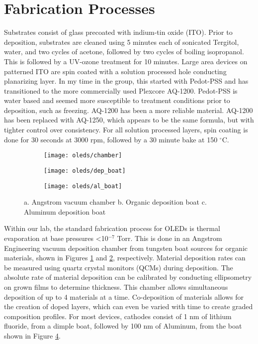 \documentclass[../thesis.tex]{subfiles}
\begin{document}
\section{Fabrication Processes}\label{sec:oleds_fabrication}

Substrates consist of glass precoated with indium-tin oxide (ITO).  
Prior to deposition, substrates are cleaned using 5 minutes each of sonicated Tergitol, water, and two cycles of acetone, followed by two cycles of boiling isopropanol.  
This is followed by a UV-ozone treatment for 10 minutes.  
Large area devices on patterned ITO are spin coated with a solution processed hole conducting planarizing layer.
In my time in the group, this started with Pedot-PSS and has transitioned to the more commercially used Plexcore AQ-1200.
Pedot-PSS is water based and seemed more susceptible to treatment conditions prior to deposition, such as freezing.
AQ-1200 has been a more reliable material.
AQ-1200 has been replaced with AQ-1250, which appears to be the same formula, but with tighter control over consistency.
For all solution processed layers, spin coating is done for 30 seconds at 3000 rpm, followed by a 30 minute bake at 150 $^\circ$C.

\begin{figure}[ht]
    \centering
    \begin{subfigure}{.3\textwidth}
    \texttt{[image: oleds/chamber]}
    \caption{}
    \label{fig:oleds_angstrom}\par\vfill
    \end{subfigure}
    \begin{subfigure}{.3\textwidth}
    \texttt{[image: oleds/dep\_boat]}
    \caption{}
    \label{fig:oleds_deposition_boat}
    \end{subfigure}
    \begin{subfigure}{.3\textwidth}
    \texttt{[image: oleds/al\_boat]}
    \caption{}
    \label{fig:oleds_al_boat}
    \end{subfigure}
\caption{a. Angstrom vacuum chamber b. Organic deposition boat c. Aluminum deposition boat}
\end{figure}

Within our lab, the standard fabrication process for OLEDs is thermal evaporation at base pressures <10$^{-7}$ Torr.  
This is done in an Angstrom Engineering vacuum deposition chamber from tungsten boat sources for organic materials, shown in Figures \ref{fig:oleds_angstrom} and \ref{fig:oleds_deposition_boat}, respectively.
Material deposition rates can be measured using quartz crystal monitors (QCMs) during deposition.
The absolute rate of material deposition can be calibrated by conducting ellipsometry on grown films to determine thickness.
This chamber allows simultaneous deposition of up to 4 materials at a time.
Co-deposition of materials allows for the creation of doped layers, which can even be varied with time to create graded composition profiles.
For most devices, cathodes consist of 1 nm of lithium fluoride, from a dimple boat, followed by 100 nm of Aluminum, from the boat shown in Figure \ref{fig:oleds_al_boat}.
\end{document}
